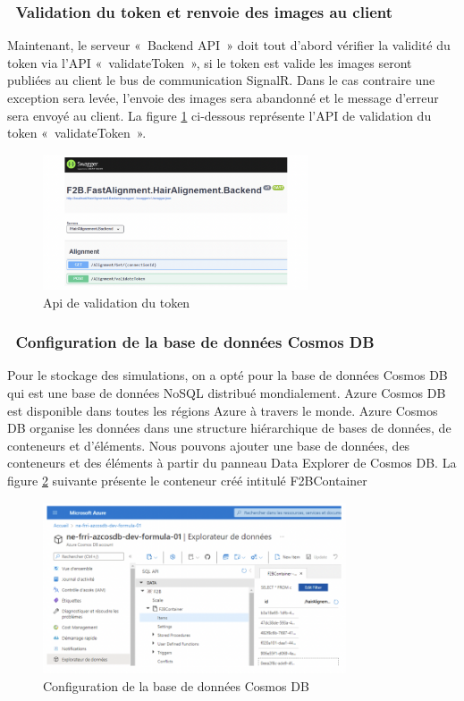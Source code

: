 \subsubsection{ Validation du token et renvoie des images au client}
Maintenant, le serveur « Backend API » doit tout d’abord vérifier la validité du token via l’API « validateToken », si le token est valide les images seront publiées au client le bus de communication SignalR. Dans le cas contraire une exception sera levée, l’envoie des images sera abandonné et le message d’erreur sera envoyé au client.
La figure \ref{fig:vldToken} ci-dessous représente l’API de validation du token « validateToken ».

\begin{figure}[!ht]\centering
\includegraphics[width=0.7\textwidth]{chapitres/chapitre4/figures/AlignementPost.png}
\caption{Api de validation du token}
\label{fig:vldToken}
\end{figure}

\newpage
\subsubsection{ Configuration de la base de données Cosmos DB}
Pour le stockage des simulations, on a opté pour la base de données Cosmos DB qui est une base de données NoSQL distribué mondialement. Azure Cosmos DB est disponible dans toutes les régions Azure à travers le monde.
Azure Cosmos DB organise les données dans une structure hiérarchique de bases de données, de conteneurs et d'éléments. Nous pouvons ajouter une base de données, des conteneurs et des éléments à partir du panneau Data Explorer de Cosmos DB.
La figure \ref{fig:comCosmos} suivante présente le conteneur créé intitulé F2BContainer

\begin{figure}[!ht]\centering
\includegraphics[width=0.8\textwidth]{chapitres/chapitre4/figures/Azure.png}
\caption{Configuration de la base de données Cosmos DB}
\label{fig:comCosmos}
\end{figure}

